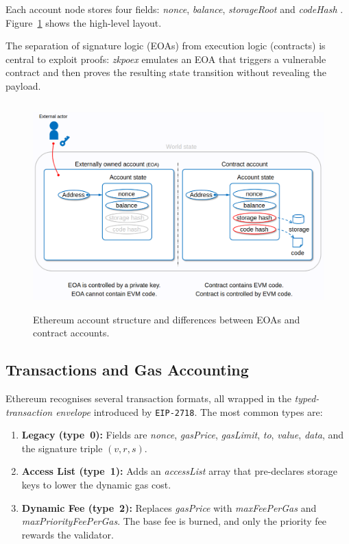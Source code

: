 Each account node stores four fields: \textit{nonce}, \textit{balance}, \textit{storageRoot} and \textit{codeHash} \cite{Wood2014}.  
Figure~\ref{fig:account_model} shows the high-level layout.

The separation of signature logic (EOAs) from execution logic (contracts) is central to exploit proofs: \textit{zkpoex} emulates an EOA that triggers a vulnerable contract and then proves the resulting state transition without revealing the payload.

\begin{figure}[h]
  \centering
  \includegraphics[width=12cm,height=8cm]{Images/Chap1/account_model.png}
  \caption{Ethereum account structure and differences between EOAs and contract accounts. \cite{ethacccounts}\cite{pdfEthAccounts}}
  \label{fig:account_model}
\end{figure}

\subsection{Transactions and Gas Accounting}\label{subsec:tx_gas}

Ethereum recognises several transaction formats, all wrapped in the \textit{typed-transaction envelope} introduced by \texttt{EIP-2718}.\cite{EIP2718}  
The most common types are:

\begin{enumerate}
  \item \textbf{Legacy (type~0):}  Fields are \textit{nonce}, \textit{gasPrice}, \textit{gasLimit}, \textit{to}, \textit{value}, \textit{data}, and the signature triple $(v,r,s)$.\cite{Wood2014}
  \item \textbf{Access List (type~1):}  Adds an \textit{accessList} array that pre-declares storage keys to lower the dynamic gas cost.\cite{EIP2930}
  \item \textbf{Dynamic Fee (type~2):}  Replaces \textit{gasPrice} with \textit{maxFeePerGas} and \textit{maxPriorityFeePerGas}.  The base fee is burned, and only the priority fee rewards the validator.\cite{EIP1559}
\end{enumerate}

